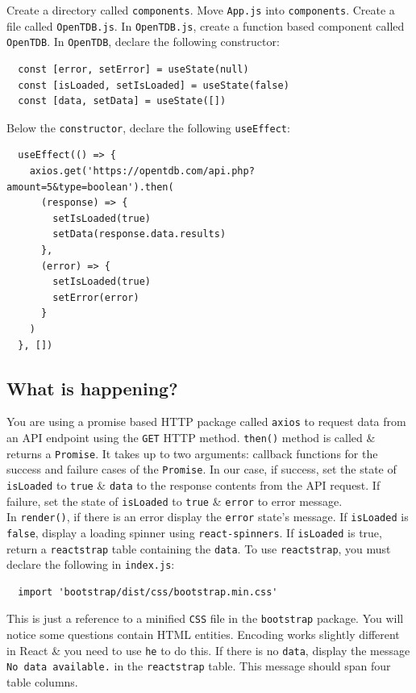 \documentclass{article}
\begin{document}
Create a directory called \texttt{components}. Move \texttt{App.js} into \texttt{components}. Create a file called \texttt{OpenTDB.js}. In \texttt{OpenTDB.js}, create a function based component called \texttt{OpenTDB}. In \texttt{OpenTDB}, declare the following constructor:
\begin{verbatim}
  const [error, setError] = useState(null)
  const [isLoaded, setIsLoaded] = useState(false)
  const [data, setData] = useState([])
\end{verbatim}

Below the \texttt{constructor}, declare the following \texttt{useEffect}:
\begin{verbatim}
  useEffect(() => {
    axios.get('https://opentdb.com/api.php?amount=5&type=boolean').then(
      (response) => {
        setIsLoaded(true)
        setData(response.data.results)
      },
      (error) => {
        setIsLoaded(true)
        setError(error)
      }
    )
  }, [])
\end{verbatim}

\subsection*{What is happening?} 
You are using a promise based HTTP package called \texttt{axios} to request data from an API endpoint using the \texttt{GET} HTTP method. \texttt{then()} method is called \& returns a \texttt{Promise}. It takes up to two arguments: callback functions for the success and failure cases of the \texttt{Promise}. In our case, if success, set the state of \texttt{isLoaded} to \texttt{true} \& \texttt{data} to the response contents from the API request. If failure, set the state of \texttt{isLoaded} to \texttt{true} \& \texttt{error} to error message. \\

In \texttt{render()}, if there is an error display the \texttt{error} state's message. If \texttt{isLoaded} is \texttt{false}, display a loading spinner using \texttt{react-spinners}. If \texttt{isLoaded} is true, return a \texttt{reactstrap} table containing the \texttt{data}. To use \texttt{reactstrap}, you must declare the following in \texttt{index.js}:

\begin{verbatim}
  import 'bootstrap/dist/css/bootstrap.min.css'
\end{verbatim}

This is just a reference to a minified \texttt{CSS} file in the \texttt{bootstrap} package. You will notice some questions contain HTML entities. Encoding works slightly different in React \& you need to use \texttt{he} to do this. If there is no \texttt{data}, display the message \texttt{No data available.} in the \texttt{reactstrap} table. This message should span four table columns. \\
\end{document}
